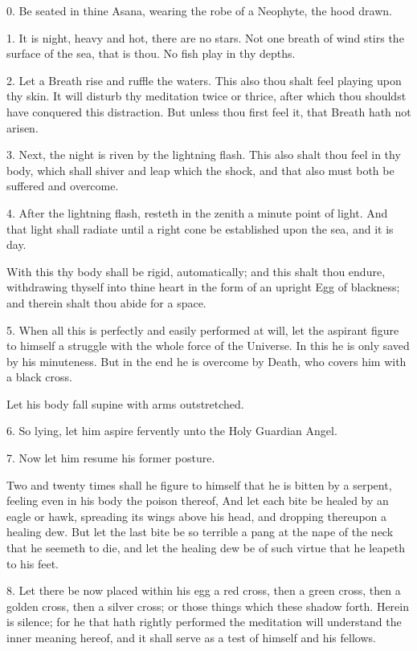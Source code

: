0. Be seated in thine Asana, wearing the robe of a Neophyte, the hood drawn.

1. It is night, heavy and hot, there are no stars. Not one breath of wind stirs the surface of the sea, that is thou. No fish play in thy depths.

2. Let a Breath rise and ruffle the waters. This also thou shalt feel playing upon thy skin. It will disturb thy meditation twice or thrice, after which thou shouldst have conquered this distraction. But unless thou first feel it, that Breath hath not arisen.

3. Next, the night is riven by the lightning flash. This also shalt thou feel in thy body, which shall shiver and leap which the shock, and that also must both be suffered and overcome.

4. After the lightning flash, resteth in the zenith a minute point of light. And that light shall radiate until a right cone be established upon the sea, and it is day.

With this thy body shall be rigid, automatically; and this shalt thou endure, withdrawing thyself into thine heart in the form of an upright Egg of blackness; and therein shalt thou abide for a space.

5. When all this is perfectly and easily performed at will, let the aspirant figure to himself a struggle with the whole force of the Universe. In this he is only saved by his minuteness. But in the end he is overcome by Death, who covers him with a black cross.

Let his body fall supine with arms outstretched.

6. So lying, let him aspire fervently unto the Holy Guardian Angel.

7. Now let him resume his former posture.

Two and twenty times shall he figure to himself that he is bitten by a serpent, feeling even in his body the poison thereof, And let each bite be healed by an eagle or hawk, spreading its wings above his head, and dropping thereupon a healing dew. But let the last bite be so terrible a pang at the nape of the neck that he seemeth to die, and let the healing dew be of such virtue that he leapeth to his feet.

8. Let there be now placed within his egg a red cross, then a green cross, then a golden cross, then a silver cross; or those things which these shadow forth. Herein is silence; for he that hath rightly performed the meditation will understand the inner meaning hereof, and it shall serve as a test of himself and his fellows.

